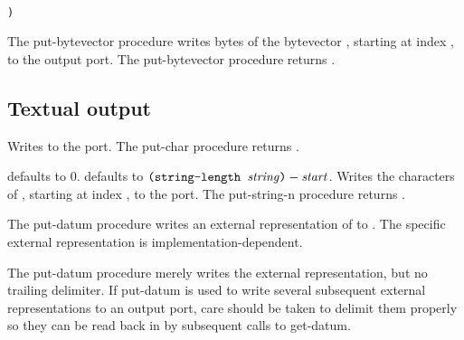 \begin{entry}{%
}
{\tt\obeyspaces\\
       )}
   
  The {\cf put-bytevector} procedure writes
 bytes of the bytevector , starting at index
, to the output port.  The {\cf put-bytevector} procedure
returns \unspecifiedreturn.
\end{entry}

\subsection{Textual output}

\begin{entry}{%
}
   
Writes  to the port. The {\cf put-char} procedure returns
\unspecifiedreturn.
\end{entry}

\begin{entry}{%
}
   
   defaults to 0.   defaults to
$\texttt{(string-length \textnormal{\textit{string}})} - \textnormal{\textit{start}}$. Writes the
 characters of , starting at
index , to the port.  The {\cf put-string-n} procedure
returns \unspecifiedreturn.
\end{entry}


\begin{entry}{%
}

The {\cf put-datum} procedure writes an external representation of
 to .
The specific external representation is implementation-dependent.

\begin{note}
  The {\cf put-datum} procedure merely writes the external
  representation, but no trailing delimiter.  If {\cf put-datum} is
  used to write several subsequent external representations to an
  output port, care should be taken to delimit them properly so they can
  be read back in by subsequent calls to {\cf get-datum}.
\end{note}
\end{entry}


